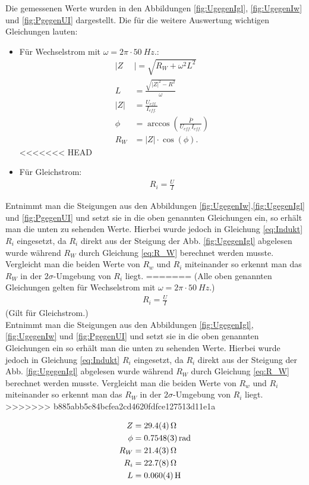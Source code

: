 Die gemessenen Werte wurden in den Abbildungen \ref{fig:UgegenIgl},  \ref{fig:UgegenIw} und \ref{fig:PgegenUI} dargestellt.
Die für die weitere Auswertung wichtigen Gleichungen lauten:
\begin{itemize}
 \item Für Wechselstrom mit $\omega=2\pi \cdot \SI{50}{Hz}.$:
\begin{align}
	|Z&|=\sqrt{R_W + \omega^2L^2}\\
	L&=\frac{\sqrt{|Z|^2-R^2}}{\omega}\\
	\label{eq:Indukt}
	|Z|&=\frac{U_{eff.}}{I_{eff.}}\\
	\phi &= \arccos\left(\frac{\bar{P}}{U_{eff.}I_{eff.}}\right)\\
	R_W&=|Z|\cdot \cos(\phi)	\label{eq:R_W}.
\end{align}
<<<<<<< HEAD
\item Für Gleichstrom:
\begin{align}
	R_i=\frac{U}{I}
\end{align}
\end{itemize}
Entnimmt man die Steigungen aus den Abbildungen \ref{fig:UgegenIw},\ref{fig:UgegenIgl} und \ref{fig:PgegenUI} und setzt sie in die oben genannten Gleichungen ein, so erhält man die unten zu sehenden Werte. Hierbei wurde jedoch in Gleichung \ref{eq:Indukt} $R_i$ eingesetzt, da $R_i$ direkt aus der Steigung der Abb. \ref{fig:UgegenIgl} abgelesen wurde während $R_W$ durch Gleichung \ref{eq:R_W} berechnet werden musste. Vergleicht man die beiden Werte von $R_w$ und $R_i$ miteinander so erkennt man das  $R_W$ in der $2\sigma$-Umgebung von $R_i$ liegt. 
=======
(Alle oben genannten Gleichungen gelten für Wechselstrom mit $\omega=2\pi \cdot \SI{50}{Hz}.$)
\begin{align}
	R_i=\frac{U}{I}
\end{align}
(Gilt für Gleichstrom.)\\
Entnimmt man die Steigungen aus den Abbildungen \ref{fig:UgegenIgl}, \ref{fig:UgegenIw} und \ref{fig:PgegenUI} und setzt sie in die oben genannten Gleichungen ein so erhält man die unten zu sehenden Werte. Hierbei wurde jedoch in Gleichung \ref{eq:Indukt} $R_i$ eingesetzt, da $R_i$ direkt aus der Steigung der Abb. \ref{fig:UgegenIgl} abgelesen wurde während $R_W$ durch Gleichung \ref{eq:R_W} berechnet werden musste. Vergleicht man die beiden Werte von $R_w$ und $R_i$ miteinander so erkennt man das  $R_W$ in der $2\sigma$-Umgebung von $R_i$ liegt. 
>>>>>>> b885abb5c84bcfea2cd4620fdfce127513d11e1a

\begin{align}
		Z &= \SI{29.4+-0.4}{\ohm}\\
		\phi &= \SI{0.7548+-0.0003}{rad}\\
		R_W &= \SI{21.4+-0.3}{\ohm}\\
		R_i &= \SI{22.7+-0.8}{\ohm}\\
		L &= \SI{0,060+-0,004}{H}
\end{align}
